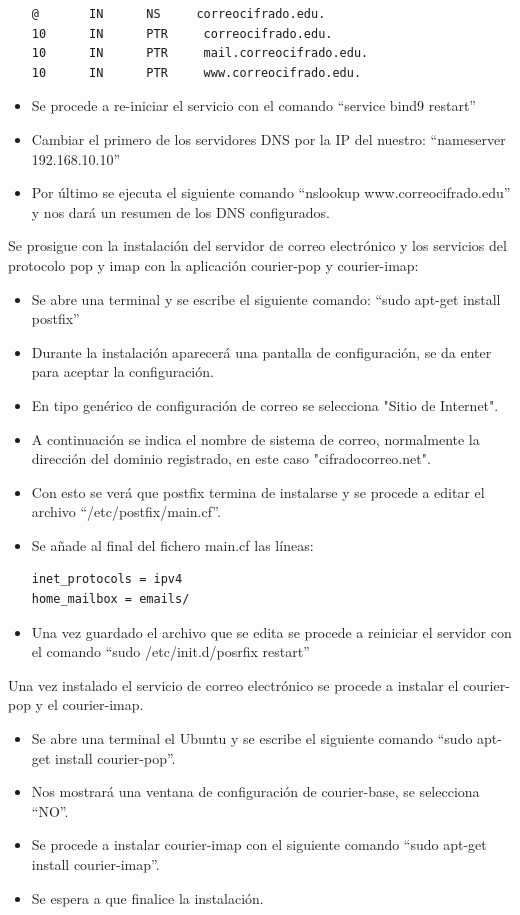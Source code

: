 \documentclass[12pt,oneside,onecolumn,openany]{report}
\begin{document}
\begin{itemize}
\begin{lstlisting}[frame=single]
@       IN      NS     correocifrado.edu.
10      IN      PTR     correocifrado.edu.
10      IN      PTR     mail.correocifrado.edu.
10      IN      PTR     www.correocifrado.edu.
  \end{lstlisting}
  \item Se procede a re-iniciar el servicio con el comando “service bind9 restart”
  \item Cambiar el primero de los servidores DNS por la IP del nuestro: “nameserver 192.168.10.10”
  \item Por último se ejecuta el siguiente comando “nslookup www.correocifrado.edu” y nos dará un resumen de los DNS configurados.
\end{itemize}
Se prosigue con la instalación del servidor de correo electrónico y los servicios del protocolo pop y imap con la aplicación courier-pop y courier-imap:
\begin{itemize}
 \item Se abre una terminal y se escribe el siguiente comando: “sudo apt-get install postfix”
 \item Durante la instalación aparecerá una pantalla de configuración, se da enter para aceptar la configuración.
 \item En tipo genérico de configuración de correo se selecciona "Sitio de Internet".
 \item A continuación se indica el nombre de sistema de correo, normalmente la dirección del dominio registrado, en este caso "cifradocorreo.net".
 \item Con esto se verá que postfix termina de instalarse y se procede a editar el archivo “/etc/postfix/main.cf”.
 \item Se añade al final del fichero main.cf las líneas:
 \begin{lstlisting}[frame=single]
  inet_protocols = ipv4
home_mailbox = emails/
 \end{lstlisting}
 \item Una vez guardado el archivo que se edita se procede a reiniciar el servidor con el comando “sudo /etc/init.d/posrfix restart”
\end{itemize}


Una vez instalado el servicio de correo electrónico se procede a instalar el courier-pop y el courier-imap.
\begin{itemize}
 \item Se abre una terminal el Ubuntu y se escribe el siguiente comando “sudo apt-get install courier-pop”.
 \item Nos mostrará una ventana de configuración de courier-base, se selecciona “NO”.
 \item Se procede a instalar courier-imap con el siguiente comando “sudo apt-get install courier-imap”.
 \item Se espera a que finalice la instalación.
\end{itemize}
\end{document}
